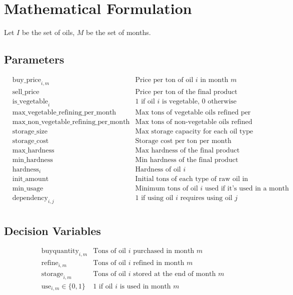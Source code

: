 \documentclass{article}
\begin{document}
\section*{Mathematical Formulation}

Let \( I \) be the set of oils, \( M \) be the set of months.

\subsection*{Parameters}
\begin{align*}
    & \text{buy\_price}_{i, m} & \text{Price per ton of oil } i \text{ in month } m \\
    & \text{sell\_price} & \text{Price per ton of the final product} \\
    & \text{is\_vegetable}_i & \text{1 if oil } i \text{ is vegetable, 0 otherwise} \\
    & \text{max\_vegetable\_refining\_per\_month} & \text{Max tons of vegetable oils refined per month} \\
    & \text{max\_non\_vegetable\_refining\_per\_month} & \text{Max tons of non-vegetable oils refined per month} \\
    & \text{storage\_size} & \text{Max storage capacity for each oil type} \\
    & \text{storage\_cost} & \text{Storage cost per ton per month} \\
    & \text{max\_hardness} & \text{Max hardness of the final product} \\
    & \text{min\_hardness} & \text{Min hardness of the final product} \\
    & \text{hardness}_i & \text{Hardness of oil } i \\
    & \text{init\_amount} & \text{Initial tons of each type of raw oil in storage} \\
    & \text{min\_usage} & \text{Minimum tons of oil } i \text{ used if it's used in a month} \\
    & \text{dependency}_{i, j} & \text{1 if using oil } i \text{ requires using oil } j \\
\end{align*}

\subsection*{Decision Variables}
\begin{align*}
    & \text{buyquantity}_{i, m} & \text{Tons of oil } i \text{ purchased in month } m \\
    & \text{refine}_{i, m} & \text{Tons of oil } i \text{ refined in month } m \\
    & \text{storage}_{i, m} & \text{Tons of oil } i \text{ stored at the end of month } m \\
    & \text{use}_{i, m} \in \{0, 1\} & \text{1 if oil } i \text{ is used in month } m \\
\end{align*}
\end{document}
